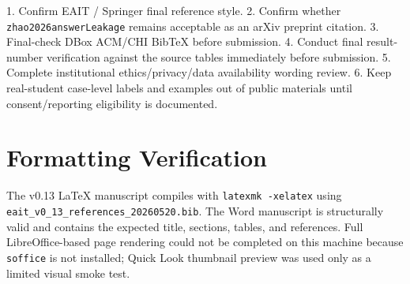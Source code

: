 \documentclass[11pt]{article}
\begin{document}
1. Confirm EAIT / Springer final reference style. 2. Confirm whether \texttt{zhao2026answerLeakage} remains acceptable as an arXiv preprint citation. 3. Final-check DBox ACM/CHI BibTeX before submission. 4. Conduct final result-number verification against the source tables immediately before submission. 5. Complete institutional ethics/privacy/data availability wording review. 6. Keep real-student case-level labels and examples out of public materials until consent/reporting eligibility is documented.

\section{Formatting Verification}

The v0.13 LaTeX manuscript compiles with \texttt{latexmk -xelatex} using \texttt{eait\_v0\_13\_references\_20260520.bib}. The Word manuscript is structurally valid and contains the expected title, sections, tables, and references. Full LibreOffice-based page rendering could not be completed on this machine because \texttt{soffice} is not installed; Quick Look thumbnail preview was used only as a limited visual smoke test.
\end{document}
